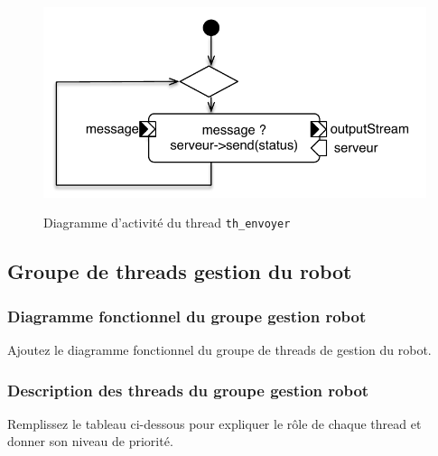 \documentclass[11pt, a4paper]{paper}
\begin{document}
\begin{figure}[htbp]
\label{fig:act_envoyer}
\begin{center}
{\includegraphics[scale=.5]{./figures-pdf/act_envoyer}}
{\caption{Diagramme d'activité du thread {\tt th\_envoyer}}}
\end{center}
\end{figure}
\FloatBarrier

\subsection{Groupe de threads gestion du robot}

\subsubsection{Diagramme fonctionnel du groupe gestion robot}
{\color{blue} Ajoutez le diagramme fonctionnel du groupe de threads de gestion du robot.}

\subsubsection{Description des threads du groupe gestion robot}
{\color{red} Remplissez le tableau ci-dessous pour expliquer le rôle de chaque thread et donner son niveau de priorité.}
\end{document}
